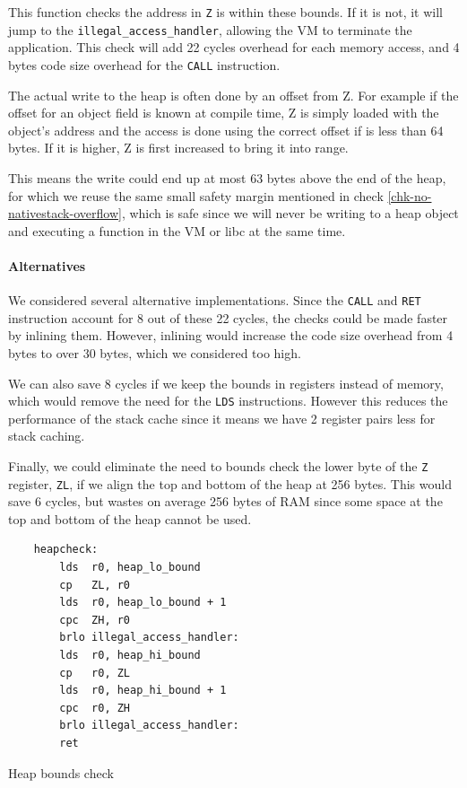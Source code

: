 This function checks the address in \texttt{Z} is within these bounds. If it is not, it will jump to the \texttt{illegal\_access\_handler}, allowing the VM to terminate the application. This check will add 22 cycles overhead for each memory access, and 4 bytes code size overhead for the \texttt{CALL} instruction.

The actual write to the heap is often done by an offset from Z. For example if the offset for an object field is known at compile time, Z is simply loaded with the object's address and the access is done using the correct offset if is less than 64 bytes. If it is higher, Z is first increased to bring it into range.

This means the write could end up at most 63 bytes above the end of the heap, for which we reuse the same small safety margin mentioned in check \ref{chk-no-nativestack-overflow}, which is safe since we will never be writing to a heap object and executing a function in the VM or libc at the same time.

\paragraph{Alternatives}
We considered several alternative implementations. Since the \texttt{CALL} and \texttt{RET} instruction account for 8 out of these 22 cycles, the checks could be made faster by inlining them. However, inlining would increase the code size overhead from 4 bytes to over 30 bytes, which we considered too high.

We can also save 8 cycles if we keep the bounds in registers instead of memory, which would remove the need for the \texttt{LDS} instructions. However this reduces the performance of the stack cache since it means we have 2 register pairs less for stack caching.

Finally, we could eliminate the need to bounds check the lower byte of the \texttt{Z} register, \texttt{ZL}, if we align the top and bottom of the heap at 256 bytes. This would save 6 cycles, but wastes on average 256 bytes of RAM since some space at the top and bottom of the heap cannot be used.

\begin{listing}[H]
	\centering
 	\begin{verbatim}
    heapcheck:
        lds  r0, heap_lo_bound
        cp   ZL, r0
        lds  r0, heap_lo_bound + 1
        cpc  ZH, r0
        brlo illegal_access_handler:
        lds  r0, heap_hi_bound
        cp   r0, ZL
        lds  r0, heap_hi_bound + 1
        cpc  r0, ZH
        brlo illegal_access_handler:
        ret
	\end{verbatim}
	\caption{Heap bounds check}
	\label{lst-heap-bounds-check}
\end{listing}

